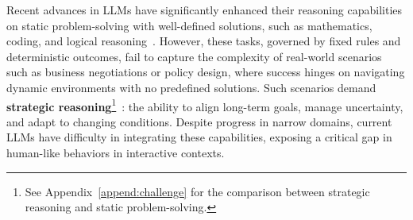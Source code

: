 
Recent advances in LLMs have significantly enhanced their reasoning capabilities on static problem-solving with well-defined solutions, such as mathematics, coding, and logical reasoning~\cite{claude,o1,qwq,gemini,guo2025deepseek}.
However, these tasks, governed by fixed rules and deterministic outcomes, fail to capture the complexity of real-world scenarios such as business negotiations or policy design, where success hinges on navigating dynamic environments with no predefined solutions.
Such scenarios demand \textbf{strategic reasoning}\footnote{See Appendix~\ref{append:challenge} for the comparison between strategic reasoning and static problem-solving.}~\cite{zhang2024llm}: the ability to align long-term goals, manage uncertainty, and adapt to changing conditions.
Despite progress in narrow domains, current LLMs have difficulty in integrating these capabilities, exposing a critical gap in human-like behaviors in interactive contexts.

